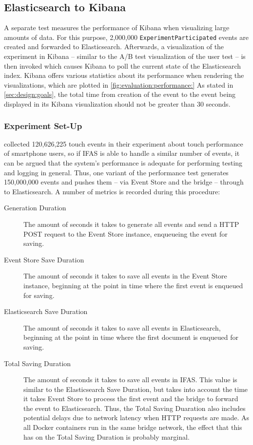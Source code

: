 \subsection{Elasticsearch to Kibana}
\label{subsec:evaluation:performance:kibana}

A separate test measures the performance of Kibana when visualizing large amounts of data.
For this purpose, 2,000,000 \texttt{ExperimentParticipated} events are created and forwarded to Elasticsearch.
Afterwards, a visualization of the experiment in Kibana -- similar to the A/B test visualization of the user test -- is then invoked which causes Kibana to poll the current state of the Elasticsearch index.
Kibana offers various statistics about its performance when rendering the visualizations, which are plotted in \cref{fig:evaluation:performance:}
As stated in \cref{sec:design:goals}, the total time from creation of the event to the event being displayed in its Kibana visualization should not be greater than 30 seconds.

\subsubsection{Experiment Set-Up}

\citet{Henze2011} collected 120,626,225 touch events in their experiment about touch performance of smartphone users, so if \ac{IFAS} is able to handle a similar number of events, it can be argued that the system's performance is adequate for performing testing and logging in general.
Thus, one variant of the performance test generates 150,000,000 events and pushes them -- via Event Store and the bridge -- through to Elasticsearch.
A number of metrics is recorded during this procedure:

\begin{description}
\item[Generation Duration] The amount of seconds it takes to generate all events and send a \ac{HTTP} POST request to the Event Store instance, enqueueing the event for saving.
\item[Event Store Save Duration] The amount of seconds it takes to save all events in the Event Store instance, beginning at the point in time where the first event is enqueued for saving.
\item[Elasticsearch Save Duration] The amount of seconds it takes to save all events in Elasticsearch, beginning at the point in time where the first document is enqueued for saving.
\item[Total Saving Duration] The amount of seconds it takes to save all events in \ac{IFAS}.
This value is similar to the Elasticsearch Save Duration, but takes into account the time it takes Event Store to process the first event and the bridge to forward the event to Elasticsearch.
Thus, the Total Saving Duaration also includes potential delays due to network latency when \ac{HTTP} requests are made.
As all Docker containers run in the same bridge network, the effect that this has on the Total Saving Duration is probably marginal.
\end{description}

